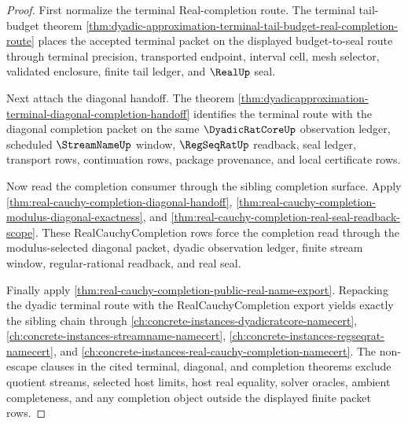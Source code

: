 \begin{proof}
First normalize the terminal Real-completion route. The terminal tail-budget theorem \autoref{thm:dyadic-approximation-terminal-tail-budget-real-completion-route} places the accepted terminal packet on the displayed budget-to-seal route through terminal precision, transported endpoint, interval cell, mesh selector, validated enclosure, finite tail ledger, and $\RealUp$ seal.

Next attach the diagonal handoff. The theorem \autoref{thm:dyadicapproximation-terminal-diagonal-completion-handoff} identifies the terminal route with the diagonal completion packet on the same $\DyadicRatCoreUp$ observation ledger, scheduled $\StreamNameUp$ window, $\RegSeqRatUp$ readback, seal ledger, transport rows, continuation rows, package provenance, and local certificate rows.

Now read the completion consumer through the sibling completion surface. Apply \autoref{thm:real-cauchy-completion-diagonal-handoff}, \autoref{thm:real-cauchy-completion-modulus-diagonal-exactness}, and \autoref{thm:real-cauchy-completion-real-seal-readback-scope}. These RealCauchyCompletion rows force the completion read through the modulus-selected diagonal packet, dyadic observation ledger, finite stream window, regular-rational readback, and real seal.

Finally apply \autoref{thm:real-cauchy-completion-public-real-name-export}. Repacking the dyadic terminal route with the RealCauchyCompletion export yields exactly the sibling chain through \autoref{ch:concrete-instances-dyadicratcore-namecert}, \autoref{ch:concrete-instances-streamname-namecert}, \autoref{ch:concrete-instances-regseqrat-namecert}, and \autoref{ch:concrete-instances-real-cauchy-completion-namecert}. The non-escape clauses in the cited terminal, diagonal, and completion theorems exclude quotient streams, selected host limits, host real equality, solver oracles, ambient completeness, and any completion object outside the displayed finite packet rows.
\end{proof}

